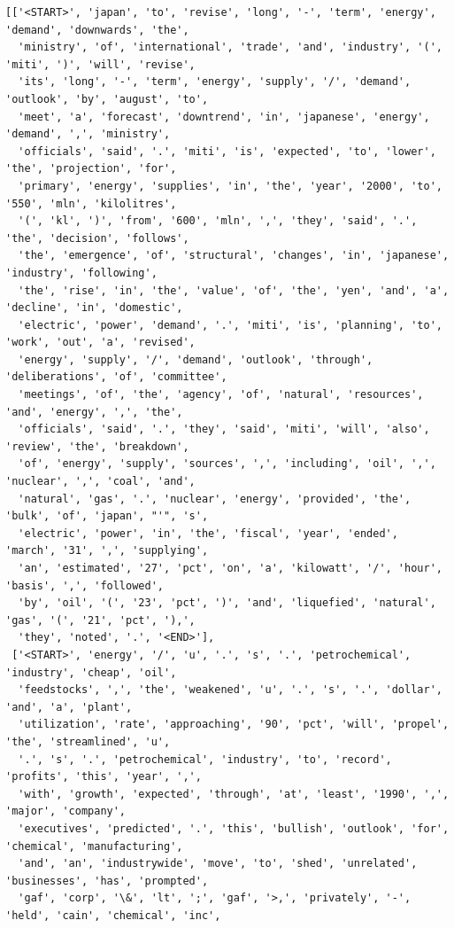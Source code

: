 \documentclass[18pt]{article}
\begin{document}
    \begin{Verbatim}[commandchars=\\\{\}]
[['<START>', 'japan', 'to', 'revise', 'long', '-', 'term', 'energy', 'demand', 'downwards', 'the',
  'ministry', 'of', 'international', 'trade', 'and', 'industry', '(', 'miti', ')', 'will', 'revise',
  'its', 'long', '-', 'term', 'energy', 'supply', '/', 'demand', 'outlook', 'by', 'august', 'to',
  'meet', 'a', 'forecast', 'downtrend', 'in', 'japanese', 'energy', 'demand', ',', 'ministry',
  'officials', 'said', '.', 'miti', 'is', 'expected', 'to', 'lower', 'the', 'projection', 'for',
  'primary', 'energy', 'supplies', 'in', 'the', 'year', '2000', 'to', '550', 'mln', 'kilolitres',
  '(', 'kl', ')', 'from', '600', 'mln', ',', 'they', 'said', '.', 'the', 'decision', 'follows',
  'the', 'emergence', 'of', 'structural', 'changes', 'in', 'japanese', 'industry', 'following',
  'the', 'rise', 'in', 'the', 'value', 'of', 'the', 'yen', 'and', 'a', 'decline', 'in', 'domestic',
  'electric', 'power', 'demand', '.', 'miti', 'is', 'planning', 'to', 'work', 'out', 'a', 'revised',
  'energy', 'supply', '/', 'demand', 'outlook', 'through', 'deliberations', 'of', 'committee',
  'meetings', 'of', 'the', 'agency', 'of', 'natural', 'resources', 'and', 'energy', ',', 'the',
  'officials', 'said', '.', 'they', 'said', 'miti', 'will', 'also', 'review', 'the', 'breakdown',
  'of', 'energy', 'supply', 'sources', ',', 'including', 'oil', ',', 'nuclear', ',', 'coal', 'and',
  'natural', 'gas', '.', 'nuclear', 'energy', 'provided', 'the', 'bulk', 'of', 'japan', "'", 's',
  'electric', 'power', 'in', 'the', 'fiscal', 'year', 'ended', 'march', '31', ',', 'supplying',
  'an', 'estimated', '27', 'pct', 'on', 'a', 'kilowatt', '/', 'hour', 'basis', ',', 'followed',
  'by', 'oil', '(', '23', 'pct', ')', 'and', 'liquefied', 'natural', 'gas', '(', '21', 'pct', '),',
  'they', 'noted', '.', '<END>'],
 ['<START>', 'energy', '/', 'u', '.', 's', '.', 'petrochemical', 'industry', 'cheap', 'oil',
  'feedstocks', ',', 'the', 'weakened', 'u', '.', 's', '.', 'dollar', 'and', 'a', 'plant',
  'utilization', 'rate', 'approaching', '90', 'pct', 'will', 'propel', 'the', 'streamlined', 'u',
  '.', 's', '.', 'petrochemical', 'industry', 'to', 'record', 'profits', 'this', 'year', ',',
  'with', 'growth', 'expected', 'through', 'at', 'least', '1990', ',', 'major', 'company',
  'executives', 'predicted', '.', 'this', 'bullish', 'outlook', 'for', 'chemical', 'manufacturing',
  'and', 'an', 'industrywide', 'move', 'to', 'shed', 'unrelated', 'businesses', 'has', 'prompted',
  'gaf', 'corp', '\&', 'lt', ';', 'gaf', '>,', 'privately', '-', 'held', 'cain', 'chemical', 'inc',

\end{Verbatim}
\end{document}
